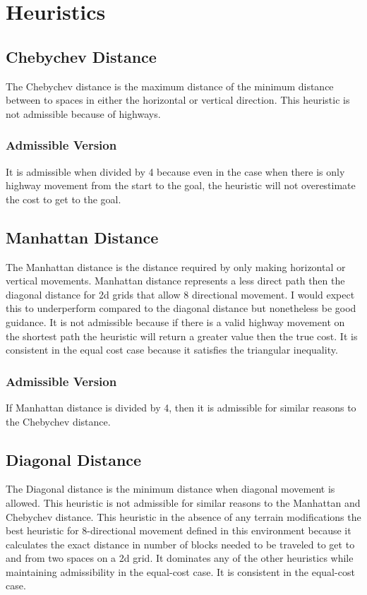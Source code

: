 \documentclass[11pt,letter]{article}
\begin{document}
\section{Heuristics}
\subsection{Chebychev Distance}
The Chebychev distance is the maximum distance of the minimum distance between to spaces in either the horizontal or vertical direction. This heuristic is not admissible because of highways. 
\subsubsection{Admissible Version}
It is admissible when divided by 4 because even in the case when there is only highway movement from the start to the goal, the heuristic will not overestimate the cost to get to the goal.

\subsection{Manhattan Distance}
The Manhattan distance is the distance required by only making horizontal or vertical movements.
Manhattan distance represents a less direct path then the diagonal distance for 2d grids that allow 8 directional movement. I would expect this to underperform compared to the diagonal distance but nonetheless be good guidance. It is not admissible because if there is a valid highway movement on the shortest path the heuristic will return a greater value then the true cost. It is consistent in the equal cost case because it satisfies the triangular inequality.

\subsubsection{Admissible Version}
If Manhattan distance is divided by 4, then it is admissible for similar reasons to the Chebychev distance.

\subsection{Diagonal Distance}
The Diagonal distance is the minimum distance when diagonal movement is allowed. This heuristic is not admissible for similar reasons to the Manhattan and Chebychev distance.
This heuristic in the absence of any terrain modifications the best heuristic for 8-directional movement defined in this environment because it calculates the exact distance in number of blocks needed to be traveled to get to and from two spaces on a 2d grid. It dominates any of the other heuristics while maintaining admissibility in the equal-cost case. It is consistent in the equal-cost case.
\end{document}
